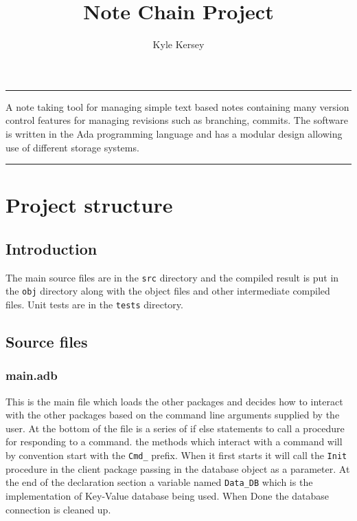 \documentclass[12pt,a4paper]{article}
\renewenvironment{abstract}{%
\hfill\begin{minipage}{0.95\textwidth}
\rule{\textwidth}{1pt}}
{\par\noindent\rule{\textwidth}{1pt}\end{minipage}}
\newcommand{\codetext}[1]{\colorbox{light-gray}{\texttt{#1}}}
\begin{document}
%
\title{\textbf{Note Chain Project}}
\author{Kyle Kersey}
\date{}

\clearpage
\maketitle
%
\begin{abstract}
A note taking tool for managing simple text based notes containing many version
control features for managing revisions such as branching, commits. The
software is written in the Ada programming language and has a modular design
allowing use of different storage systems.
\end{abstract}

\renewcommand\cftsecleader{\cftdotfill{\cftdotsep}}

\tableofcontents
\thispagestyle{empty}
\pagebreak
\setcounter{page}{1}


\section{Project structure}

\subsection{Introduction}
The main source files are in the \codetext{src} directory and the compiled
result is put in the \codetext{obj} directory along with the object files and
other intermediate compiled files. Unit tests are in the \codetext{tests}
directory.

\subsection{Source files}
\subsubsection{main.adb}
This is the main file which loads the other packages and decides how to
interact with the other packages based on the command line arguments supplied
by the user. At the bottom of the file is a series of if else statements to
call a procedure for responding to a command. the methods which interact with a
command will by convention start with the \codetext{Cmd\_} prefix. When it
first starts it will call the \codetext{Init} procedure in the client package
passing in the database object as a parameter. At the end of the declaration
section a variable named \codetext{Data\_DB} which is the implementation of
Key-Value database being used. When Done the database connection is cleaned up.
\end{document}
